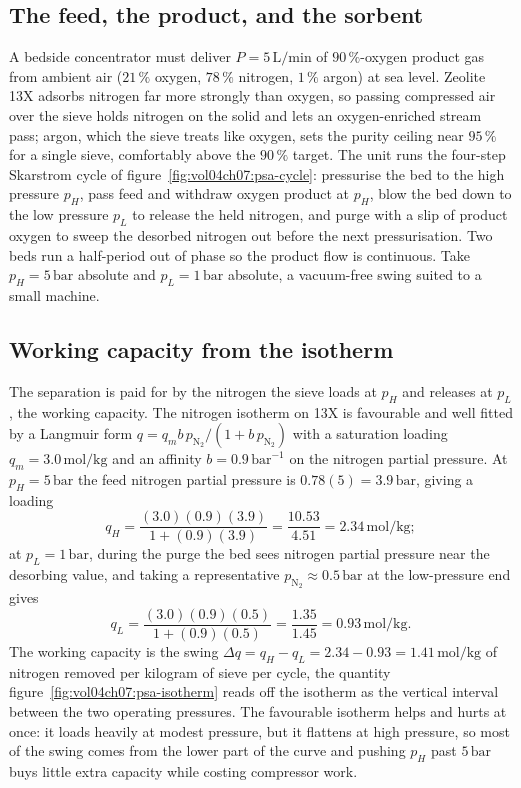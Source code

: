 \subsection{The feed, the product, and the sorbent}

A bedside concentrator must deliver $P = 5\,\text{L/min}$ of
$90\,\%$-oxygen product gas from ambient air ($21\,\%$ oxygen,
$78\,\%$ nitrogen, $1\,\%$ argon) at sea level. Zeolite 13X adsorbs
nitrogen far more strongly than oxygen, so passing compressed air over the
sieve holds nitrogen on the solid and lets an oxygen-enriched stream pass;
argon, which the sieve treats like oxygen, sets the purity ceiling near
$95\,\%$ for a single sieve, comfortably above the $90\,\%$ target. The
unit runs the four-step Skarstrom cycle of
figure~\ref{fig:vol04ch07:psa-cycle}: pressurise the bed to the high
pressure $p_H$, pass feed and withdraw oxygen product at $p_H$, blow the
bed down to the low pressure $p_L$ to release the held nitrogen, and purge
with a slip of product oxygen to sweep the desorbed nitrogen out before the
next pressurisation. Two beds run a half-period out of phase so the product
flow is continuous. Take $p_H = 5\,\text{bar}$ absolute and $p_L =
1\,\text{bar}$ absolute, a vacuum-free swing suited to a small machine.



\subsection{Working capacity from the isotherm}

The separation is paid for by the nitrogen the sieve loads at $p_H$ and
releases at $p_L$, the working capacity. The nitrogen isotherm on 13X is
favourable and well fitted by a Langmuir form
$q = q_m b\,p_{\text{N}_2}/(1 + b\,p_{\text{N}_2})$ with a saturation
loading $q_m = 3.0\,\text{mol/kg}$ and an affinity $b = 0.9\,\text{bar}^{-1}$
on the nitrogen partial pressure. At $p_H = 5\,\text{bar}$ the feed
nitrogen partial pressure is $0.78(5) = 3.9\,\text{bar}$, giving a loading
\[
q_H = \frac{(3.0)(0.9)(3.9)}{1 + (0.9)(3.9)} = \frac{10.53}{4.51} =
2.34\,\text{mol/kg};
\]
at $p_L = 1\,\text{bar}$, during the purge the bed sees nitrogen partial
pressure near the desorbing value, and taking a representative
$p_{\text{N}_2}\approx 0.5\,\text{bar}$ at the low-pressure end gives
\[
q_L = \frac{(3.0)(0.9)(0.5)}{1 + (0.9)(0.5)} = \frac{1.35}{1.45} =
0.93\,\text{mol/kg}.
\]
The working capacity is the swing $\Delta q = q_H - q_L = 2.34 - 0.93 =
1.41\,\text{mol/kg}$ of nitrogen removed per kilogram of sieve per cycle,
the quantity figure~\ref{fig:vol04ch07:psa-isotherm} reads off the isotherm
as the vertical interval between the two operating pressures. The favourable
isotherm helps and hurts at once: it loads heavily at modest pressure, but
it flattens at high pressure, so most of the swing comes from the lower
part of the curve and pushing $p_H$ past $5\,\text{bar}$ buys little extra
capacity while costing compressor work.


